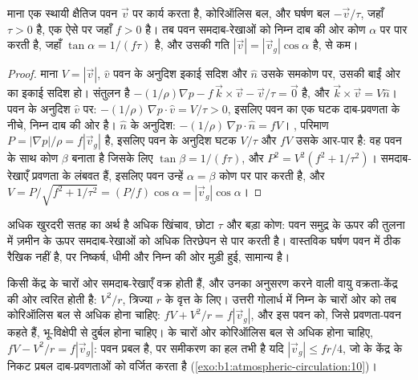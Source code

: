 \begin{proposition}[घर्षण पवन को निम्न दाब की ओर मोड़ता है]\label{prop:b1:atmospheric-circulation:friction}
माना एक स्थायी क्षैतिज पवन $\vec v$ पर  कार्य करता है,
कोरिऑलिस बल, और घर्षण बल $-\vec v/\tau$, जहाँ $\tau > 0$ है, एक ऐसे  पर जहाँ $f > 0$ है। तब पवन समदाब-रेखाओं को निम्न दाब की ओर
कोण $\alpha$ पर पार करती है, जहाँ $\tan\alpha = 1/(f\tau)$ है, और उसकी गति $|\vec v| =
|\vec v_g|\cos\alpha$ है,  से कम।
\end{proposition}

\begin{proof}
माना $V = |\vec v|$, $\hat v$ पवन के अनुदिश इकाई सदिश और $\hat n$ उसके समकोण पर, उसकी बाईं ओर का इकाई सदिश हो। संतुलन है $-(1/\rho)\nabla p - f\,
\vec k\times\vec v - \vec v/\tau = \vec 0$ है, और $\vec k\times\vec v = V\hat n$।
पवन के अनुदिश $\hat v$ पर: $-(1/\rho)\,\nabla p\cdot\hat v = V/\tau > 0$, इसलिए पवन का एक घटक दाब-प्रवणता के नीचे, निम्न दाब की ओर है। $\hat n$ के अनुदिश:
$-(1/\rho)\,\nabla p\cdot\hat n = fV$। , परिमाण $P =
|\nabla p|/\rho = f|\vec v_g|$ है, इसलिए पवन के अनुदिश घटक $V/\tau$ और
$fV$ उसके आर-पार है: वह पवन के साथ कोण $\beta$ बनाता है जिसके लिए $\tan\beta =
1/(f\tau)$, और $P^2 = V^2(f^2 + 1/\tau^2)$। समदाब-रेखाएँ प्रवणता के लंबवत हैं, इसलिए पवन उन्हें $\alpha = \beta$ कोण पर पार करती है, और $V = P/\sqrt{f^2 +
1/\tau^2} = (P/f)\cos\alpha = |\vec v_g|\cos\alpha$।
\end{proof}

अधिक खुरदरी सतह का अर्थ है अधिक खिंचाव, छोटा $\tau$ और बड़ा कोण: पवन समुद्र के ऊपर की तुलना में ज़मीन के ऊपर समदाब-रेखाओं को अधिक तिरछेपन से पार करती है। वास्तविक घर्षण पवन में ठीक रैखिक नहीं है, पर निष्कर्ष, धीमी और निम्न की ओर मुड़ी हुई, सामान्य है।

\begin{remark}\label{rem:b1:atmospheric-circulation:gradient}
किसी केंद्र के चारों ओर समदाब-रेखाएँ वक्र होती हैं, और उनका अनुसरण करने वाली वायु वक्रता-केंद्र की ओर त्वरित होती है: $V^2/r$, त्रिज्या $r$ के वृत्त के लिए। उत्तरी गोलार्ध में निम्न के चारों ओर  को तब कोरिऑलिस बल से अधिक होना चाहिए: $fV + V^2/r = f|\vec v_g|$, और इस पवन को, जिसे प्रवणता-पवन कहते हैं, भू-विक्षेपी से दुर्बल होना चाहिए।  के चारों ओर कोरिऑलिस बल  से अधिक होना चाहिए, $fV - V^2/r = f|\vec v_g|$: पवन प्रबल है, पर समीकरण का हल तभी है यदि $|\vec v_g| \leq fr/4$, जो  के केंद्र के निकट प्रबल दाब-प्रवणताओं को वर्जित करता है (\cref{exo:b1:atmospheric-circulation:10})।
\end{remark}

